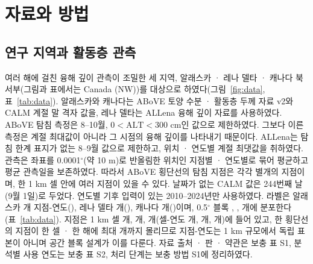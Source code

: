 \section{자료와 방법}\label{sec:methods}

\subsection{연구 지역과 활동층 관측}
여러 해에 걸친 융해 깊이 관측이 조밀한 세 지역, 알래스카 · 레나 델타 · 캐나다 북서부(그림과 표에서는 Canada (NW))를 대상으로 하였다(그림~\ref{fig:data}, 표~\ref{tab:data}). 알래스카와 캐나다는 ABoVE 토양 수분 · 활동층 두께 자료 v2\cite{Moore2025}와 CALM 계절 말 격자 값\cite{Streletskiy2025}을, 레나 델타는 ALLena 융해 깊이 자료\cite{Veremeeva2025}를 사용하였다. ABoVE 탐침 측정은 8--10월, $0<\mathrm{ALT}<300$ cm인 값으로 제한하였다. 그보다 이른 측정은 계절 최대값이 아니라 그 시점의 융해 깊이를 나타내기 때문이다. ALLena는 탐침 한계 표지가 없는 8--9월 값으로 제한하고, 위치 · 연도별 계절 최댓값을 취하였다. 관측은 좌표를 0.0001$^\circ$(약 10 m)로 반올림한 위치인 지점별 · 연도별로 묶어 평균하고 평균 관측일을 보존하였다. 따라서 ABoVE 횡단선의 탐침 지점은 각각 별개의 지점이며, 한 1 km 셀 안에 여러 지점이 있을 수 있다. 날짜가 없는 CALM 값은 244번째 날(9월 1일)로 두었다. 연도별 기후 입력이 있는 2010--2024년만 사용하였다. 라벨은 알래스카 \nncyAk{}개 지점-연도(\nyrsAkko), 레나 델타 \nncyLe{}개(\nyrsLeko), 캐나다 \nncyCa{}개(\nyrsCako)이며, 0.5$^\circ$ 블록 \nnblkAk, \nnblkLe, \nnblkCa{}개에 분포한다(표~\ref{tab:data}). 지점은 1 km 셀 \nnkmcellAk{}개, \nnkmcellLe{}개, \nnkmcellCa{}개(셀-연도 \nnkmcyAk{}개, \nnkmcyLe{}개, \nnkmcyCa{}개)에 들어 있고, 한 횡단선의 지점이 한 셀 · 한 해에 최대 \nnkmmaxAk{}개까지 몰리므로 지점-연도는 1 km 규모에서 독립 표본이 아니며 공간 블록 설계가 이를 다룬다. 자료 출처 · 판 · 약관은 보충 표 S1, 분석별 사용 연도는 보충 표 S2, 처리 단계는 보충 방법 S1에 정리하였다.




